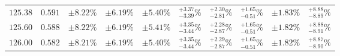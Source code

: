 \begin{table}[ht!]
{{\begin{tabular}{| cc | ccc | cccc | c |}
$125.38$ & $0.591$ & $\pm8.22\%$ & {\color{black!55}$\pm 6.19\%$} & {\color{black!55}$\pm 5.40\%$} & $^{+3.37}_{-3.39}\%$ & {\color{black!55}$^{+2.30}_{-2.81}\%$} & {\color{black!55}$^{+1.65}_{-0.51}\%$} & {\color{black!55}$\pm 1.83\%$} & $^{+8.88}_{-8.89}\%$  \\
$125.60$ & $0.588$ & $\pm8.22\%$ & {\color{black!55}$\pm 6.19\%$} & {\color{black!55}$\pm 5.41\%$} & $^{+3.35}_{-3.44}\%$ & {\color{black!55}$^{+2.28}_{-2.87}\%$} & {\color{black!55}$^{+1.65}_{-0.51}\%$} & {\color{black!55}$\pm 1.82\%$} & $^{+8.88}_{-8.91}\%$  \\
$126.00$ & $0.582$ & $\pm8.21\%$ & {\color{black!55}$\pm 6.19\%$} & {\color{black!55}$\pm 5.40\%$} & $^{+3.35}_{-3.44}\%$ & {\color{black!55}$^{+2.29}_{-2.87}\%$} & {\color{black!55}$^{+1.65}_{-0.51}\%$} & {\color{black!55}$\pm 1.82\%$} & $^{+8.87}_{-8.90}\%$  \\

\end{tabular}}}
\end{table}
